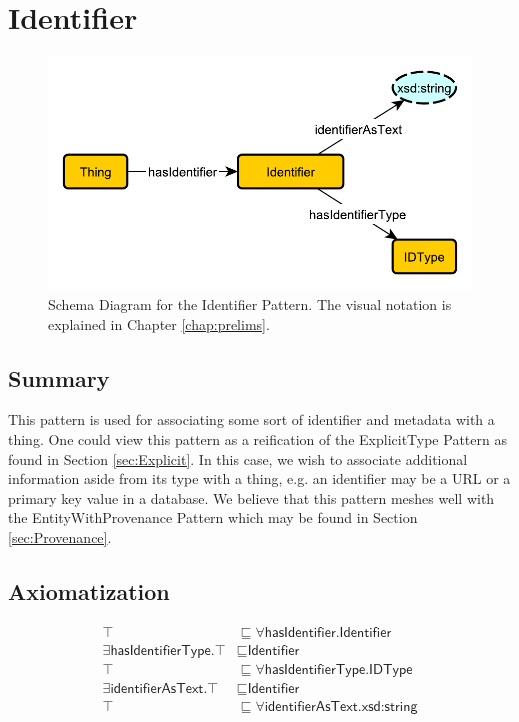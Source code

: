 \section{Identifier}
\label{sec:Identifier}
\begin{figure}[h!]
\begin{center}
\includegraphics[width=.7\textwidth]{figures/identifier}
\end{center}
\caption{Schema Diagram for the Identifier Pattern. The visual notation is explained in Chapter \ref{chap:prelims}.}
\label{fig:Identifier}
\end{figure}
\subsection{Summary}
\label{sum:Identifier}
This pattern is used for associating some sort of identifier and metadata with a thing. One could view this pattern as a reification of the \textsf{ExplicitType} Pattern as found in Section \ref{sec:Explicit}. In this case, we wish to associate additional information aside from its type with a thing, e.g. an identifier may be a URL or a primary key value in a database. We believe that this pattern meshes well with the \textsf{EntityWithProvenance} Pattern which may be found in Section \ref{sec:Provenance}.

\subsection{Axiomatization}
\label{axs:Identifier}
\begin{align}
\top &\sqsubseteq \forall \textsf{hasIdentifier.Identifier} \\
\exists \textsf{hasIdentifierType.}\top &\sqsubseteq \textsf{Identifier} \\
\top &\sqsubseteq \forall \textsf{hasIdentifierType.IDType} \\
\exists \textsf{identifierAsText.}\top &\sqsubseteq \textsf{Identifier} \\
\top &\sqsubseteq \forall \textsf{identifierAsText.xsd:string}
\end{align}

